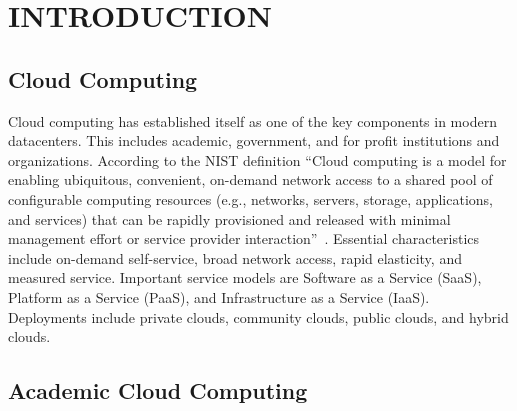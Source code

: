 \documentclass{sig-alternate-05-2015}
\begin{document}

\printccsdesc



\section{INTRODUCTION}

\subsection{Cloud Computing}

Cloud computing has established itself as one of the key components in modern datacenters. This includes academic, government, and for profit institutions and organizations.  According to the NIST definition ``Cloud computing is a model for enabling ubiquitous, convenient, on-demand network access to a shared pool of configurable computing resources (e.g., networks, servers, storage, applications, and services) that can be rapidly provisioned and released with minimal management effort or service provider interaction''~\cite{mell2011nist}. Essential characteristics include on-demand self-service, broad network access, rapid elasticity, and measured service. Important service models are Software as a Service (SaaS), Platform as a Service (PaaS), and Infrastructure as a Service (IaaS). Deployments include private clouds, community clouds, public clouds, and hybrid clouds.

\subsection{Academic Cloud Computing}
\end{document}
